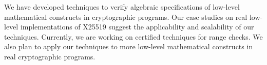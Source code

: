 
We have developed techniques to verify algebraic specifications of
low-level mathematical constructs in cryptographic programs. Our case
studies on real low-level implementations of X25519 suggest the
applicability and scalability of our techniques. Currently, we are
working on certified techniques for range checks. We also plan to
apply our techniques to more low-level mathematical constructs in real
cryptographic programs.